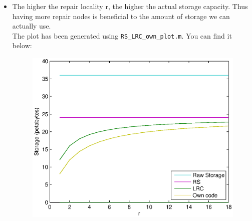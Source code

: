 \documentclass[12pt,a4paper,oneside]{article}
\begin{document}
\begin{itemize}
\item The higher the repair locality r, the higher the actual storage capacity. Thus having more repair nodes is beneficial to the amount of storage we can actually use.\\
The plot has been generated using \verb|RS_LRC_own_plot.m|. You can find it below:
\begin{figure}
\centering
\includegraphics{RS_LRC_own_plot.eps}
\end{figure}
\end{itemize}
\end{document}
